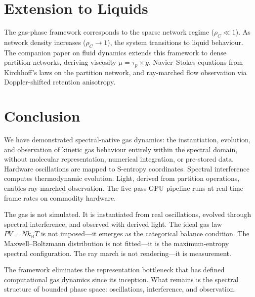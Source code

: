 \documentclass[twocolumn,10pt,a4paper]{article}
\theoremstyle{plain}
\theoremstyle{definition}
\theoremstyle{remark}
\newcommand{\kB}{k_{\mathrm{B}}}
\newcommand{\taup}{\tau_p}
\begin{document}
\section{Extension to Liquids}
\label{sec:extension}

The gas-phase framework corresponds to the sparse network regime ($\rho_C \ll 1$). As network density increases ($\rho_C \to 1$), the system transitions to liquid behaviour. The companion paper on fluid dynamics extends this framework to dense partition networks, deriving viscosity $\mu = \taup \times g$, Navier--Stokes equations from Kirchhoff's laws on the partition network, and ray-marched flow observation via Doppler-shifted retention anisotropy.

\section{Conclusion}
\label{sec:conclusion}

We have demonstrated spectral-native gas dynamics: the instantiation, evolution, and observation of kinetic gas behaviour entirely within the spectral domain, without molecular representation, numerical integration, or pre-stored data. Hardware oscillations are mapped to S-entropy coordinates. Spectral interference computes thermodynamic evolution. Light, derived from partition operations, enables ray-marched observation. The five-pass GPU pipeline runs at real-time frame rates on commodity hardware.

The gas is not simulated. It is instantiated from real oscillations, evolved through spectral interference, and observed with derived light. The ideal gas law $PV = N\kB T$ is not imposed---it emerges as the categorical balance condition. The Maxwell--Boltzmann distribution is not fitted---it is the maximum-entropy spectral configuration. The ray march is not rendering---it is measurement.

The framework eliminates the representation bottleneck that has defined computational gas dynamics since its inception. What remains is the spectral structure of bounded phase space: oscillations, interference, and observation.



\end{document}
